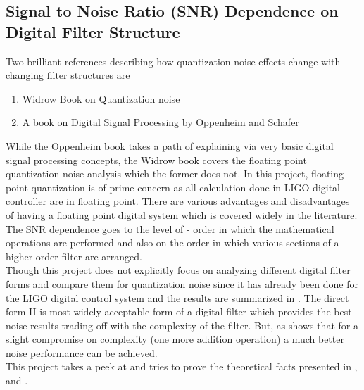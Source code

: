 \documentclass[colorlinks=true,pdfstartview=FitV,linkcolor=blue,
            citecolor=red,urlcolor=magenta]{ligodoc}
\begin{document}
	\subsection{Signal to Noise Ratio (SNR) Dependence on Digital Filter Structure} Two brilliant references describing how quantization noise effects change with changing filter structures are
	 \begin{enumerate}
		\item Widrow Book on Quantization noise \cite{Widrow}
		\item A book on Digital Signal Processing by Oppenheim and Schafer \cite{Oppenheim}
	\end{enumerate}
	While the Oppenheim book takes a path of explaining via very basic digital signal processing concepts, the Widrow book covers the floating point quantization noise analysis which the former does not. In this project, floating point quantization is of prime concern as all calculation done in LIGO digital controller are in floating point. There are various advantages and disadvantages of having a floating point digital system which is covered widely in the literature. 
	The SNR dependence goes to the level of - order in which the mathematical operations are performed and also on the order in which various sections of a higher order filter are arranged. \\
		Though this project does not explicitly focus on analyzing different digital filter forms and compare them for quantization noise since it has already been done for the LIGO digital control system and the results are summarized in \cite{matts}. The direct form II is most widely acceptable form of a digital filter which provides the best noise results trading off with the complexity of the filter. But, as \cite{matts} shows that for a slight compromise on complexity (one more addition operation) a much better noise performance can be achieved. \\ This project takes a peek at and tries to prove the theoretical facts presented in \cite{matts}, \cite{Oppenheim} and \cite{Widrow}. 
\end{document}
